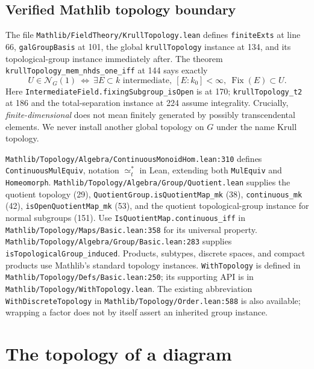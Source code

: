 \documentclass[11pt]{article}
\theoremstyle{remark}\newtheorem{remark}[theorem]{Remark}
\newcommand{\Fix}{\operatorname{Fix}}
\newcommand{\code}[1]{{\normalfont\nolinkurl{#1}}}
\begin{document}
\subsection{Verified Mathlib topology boundary}

The file \code{Mathlib/FieldTheory/KrullTopology.lean} defines
\code{finiteExts} at line 66, \code{galGroupBasis} at 101,
the global \code{krullTopology} instance at 134, and its topological-group
instance immediately after. The theorem
\code{krullTopology_mem_nhds_one_iff} at 144 says exactly
\[
 U\in\mathcal N_G(1)\ \Longleftrightarrow\
 \exists E\subset k\text{ intermediate},\ [E:k_0]<\infty,
                       \ \Fix(E)\subset U.                    \tag{K0}\label{eq:K0}
\]
Here \code{IntermediateField.fixingSubgroup_isOpen} is at 170;
\code{krullTopology_t2} at 186 and the total-separation instance at 224
assume integrality. Crucially, \emph{finite-dimensional} does not mean
finitely generated by possibly transcendental elements. We never install
another global topology on $G$ under the name Krull topology.

\code{Mathlib/Topology/Algebra/ContinuousMonoidHom.lean:310} defines
\code{ContinuousMulEquiv}, notation $\simeq_{\!t}^{\!*}$ in Lean, extending both
\code{MulEquiv} and \code{Homeomorph}.
\code{Mathlib/Topology/Algebra/Group/Quotient.lean} supplies the quotient
topology (29), \code{QuotientGroup.isQuotientMap_mk} (38),
\code{continuous_mk} (42), \code{isOpenQuotientMap_mk} (53), and the
quotient topological-group instance for normal subgroups (151).
Use \code{IsQuotientMap.continuous_iff} in
\code{Mathlib/Topology/Maps/Basic.lean:358} for its universal property.
\code{Mathlib/Topology/Algebra/Group/Basic.lean:283} supplies
\code{isTopologicalGroup_induced}. Products, subtypes, discrete spaces,
and compact products use Mathlib's standard topology instances.
\code{WithTopology} is defined in
\code{Mathlib/Topology/Defs/Basic.lean:250}; its supporting API is in
\code{Mathlib/Topology/WithTopology.lean}.
The existing abbreviation \code{WithDiscreteTopology} in
\code{Mathlib/Topology/Order.lean:588} is also available; wrapping a
factor does not by itself assert an inherited group instance.

\section{The topology of a diagram}
\label{sec:diagram}
\end{document}
